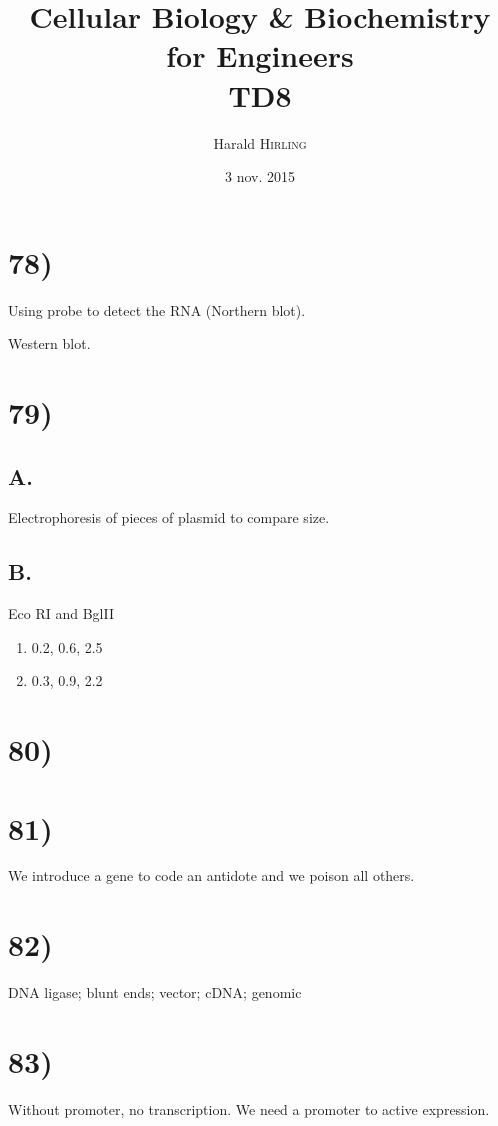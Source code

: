 

\title{Cellular Biology \& Biochemistry for Engineers\\TD8}
\author{Harald \textsc{Hirling}}
\date{3 nov. 2015}


\maketitle

\section*{78)}
Using probe to detect the RNA (Northern blot).

Western blot.

\section*{79)}
\subsection*{A.}
Electrophoresis of pieces of plasmid to compare size.

\subsection*{B.}
Eco RI and BglII
\begin{enumerate}[A:]
    \item 0.2, 0.6, 2.5
    \item 0.3, 0.9, 2.2
\end{enumerate}

\section*{80)}


\section*{81)}
We introduce a gene to code an antidote and we poison all others.

\section*{82)}
DNA ligase; blunt ends; vector; cDNA; genomic

\section*{83)}
Without promoter, no transcription. We need a promoter to active expression.

